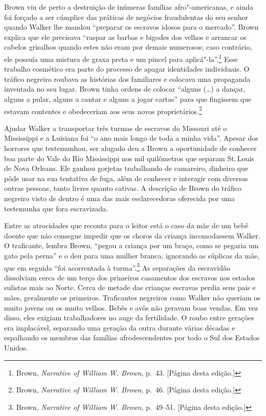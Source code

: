 Brown viu de perto a destruição de inúmeras famílias afro"-americanas, e
ainda foi forçado a ser cúmplice das práticas de negócios fraudulentas
do seu senhor quando Walker lhe mandou ``preparar os escravos
idosos para o mercado''. Brown explica que ele precisava ``raspar as
barbas e bigodes dos velhos e arrancar os cabelos grisalhos quando estes
não eram por demais numerosos; caso contrário, ele possuía uma mistura
de graxa preta e um pincel para aplicá"-la''.\footnote{Brown,
  \emph{Narrative of William W. Brown}, p.~43. {[}Página \pageref{ref7} desta
  edição.{]}} Esse trabalho cosmético era parte do processo de apagar
identidades individuais. O tráfico negreiro roubava as histórias dos
familiares e colocava uma propaganda inventada no seu lugar. Brown tinha
ordens de colocar ``alguns (\ldots{}) a dançar, alguns a pular, alguns a
cantar e alguns a jogar cartas'' para que fingissem que estavam
contentes e obedeceriam aos seus novos proprietários.\footnote{Brown,
  \emph{Narrative of William W. Brown}, p.~46. {[}Página \pageref{ref8} desta
  edição.{]}}

Ajudar Walker a transportar três turmas de escravos do
Missouri até o Mississippi e a Luisiana foi ``o ano mais longo de toda a
minha vida''. Apesar dos horrores que testemunhou, ser alugado deu a
Brown a oportunidade de conhecer boa parte do Vale do Rio Mississippi
nos mil quilômetros que separam St.\,Louis de Nova Orleans. Ele ganhou
gorjetas trabalhando de camareiro, dinheiro que pôde usar na sua
tentativa de fuga, além de conhecer e interagir com diversas outras
pessoas, tanto livres quanto cativas. A descrição de Brown do
tráfico negreiro visto de dentro é uma das mais esclarecedoras
oferecida por uma testemunha que fora escravizada.

Entre as atrocidades que reconta para o leitor está o caso da mãe de um
bebê doente que não consegue impedir que os choros da criança
incomodassem Walker. O traficante, lembra Brown, ``pegou a criança por
um braço, como se pegaria um gato pela perna'' e o deu para uma mulher
branca, ignorando as súplicas da mãe, que em seguida ``foi acorrentada à
turma''.\footnote{Brown, \emph{Narrative of William W. Brown}, p.~49--51.
  {[}Página \pageref{ref9} desta edição.{]}} As separações da escravidão dissolviam
cerca de um terço dos primeiros casamentos dos escravos nos estados
sulistas mais ao Norte. Cerca de metade das crianças escravas
perdia seus pais e mães, geralmente os primeiros. Traficantes negreiros como Walker não queriam os muito jovens ou os muito velhos.
Bebês e avôs não geravam boas vendas. Em vez disso, eles exigiam
trabalhadores no auge da fertilidade. O roubo entre gerações era
implacável, separando uma geração da outra durante várias décadas e
espalhando os membros das famílias afrodescendentes por todo o Sul dos
Estados Unidos.

